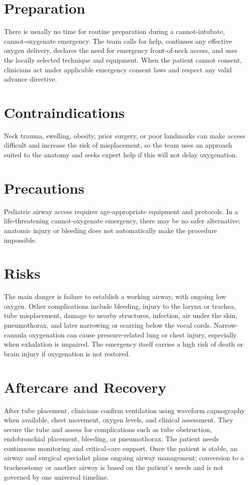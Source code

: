 \section*{Preparation}
There is usually no time for routine preparation during a cannot-intubate, cannot-oxygenate emergency. The team calls for help, continues any effective oxygen delivery, declares the need for emergency front-of-neck access, and uses the locally selected technique and equipment. When the patient cannot consent, clinicians act under applicable emergency consent laws and respect any valid advance directive.

\section*{Contraindications}
Neck trauma, swelling, obesity, prior surgery, or poor landmarks can make access difficult and increase the risk of misplacement, so the team uses an approach suited to the anatomy and seeks expert help if this will not delay oxygenation.

\section*{Precautions}
Pediatric airway access requires age-appropriate equipment and protocols. In a life-threatening cannot-oxygenate emergency, there may be no safer alternative; anatomic injury or bleeding does not automatically make the procedure impossible.

\section*{Risks}
The main danger is failure to establish a working airway, with ongoing low oxygen. Other complications include bleeding, injury to the larynx or trachea, tube misplacement, damage to nearby structures, infection, air under the skin, pneumothorax, and later narrowing or scarring below the vocal cords. Narrow-cannula oxygenation can cause pressure-related lung or chest injury, especially when exhalation is impaired. The emergency itself carries a high risk of death or brain injury if oxygenation is not restored.

\section*{Aftercare and Recovery}
After tube placement, clinicians confirm ventilation using waveform capnography when available, chest movement, oxygen levels, and clinical assessment. They secure the tube and assess for complications such as tube obstruction, endobronchial placement, bleeding, or pneumothorax. The patient needs continuous monitoring and critical-care support. Once the patient is stable, an airway and surgical specialist plans ongoing airway management; conversion to a tracheostomy or another airway is based on the patient's needs and is not governed by one universal timeline.

